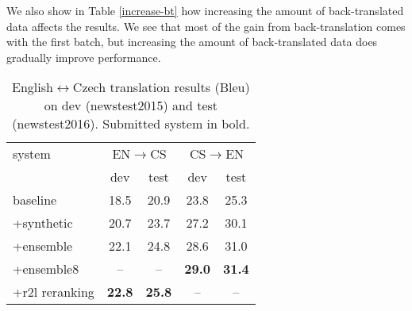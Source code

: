 \documentclass[11pt]{article}
\begin{document}
We also show in Table \ref{increase-bt} how increasing the amount of back-translated data
affects the results. We see that most of the gain from back-translation comes with the first batch, but increasing the amount of back-translated data does
gradually improve performance.

\begin{table}
\centering
\begin{tabular}{l|cc|cc}
system & \multicolumn{2}{c|}{EN$\to$CS} & \multicolumn{2}{c}{CS$\to$EN}\\
& dev & test & dev & test\\
\hline
baseline & 18.5 & 20.9 &   %
23.8 & 25.3\\ %
+synthetic & 20.7 & 23.7 &  %
27.2 & 30.1 \\ %
+ensemble & 22.1 & 24.8 &  %
28.6 & 31.0 \\ %
+ensemble8 & -- & -- & 
\textbf{29.0} & \textbf{31.4} \\ %
+r2l reranking & \textbf{22.8} & \textbf{25.8} &  %
-- & -- \\
\end{tabular}
\caption{English$\leftrightarrow$Czech translation results ({\sc Bleu}) on dev (newstest2015) and test (newstest2016). Submitted system in bold.}
\label{results-cs}
\end{table}
\end{document}

